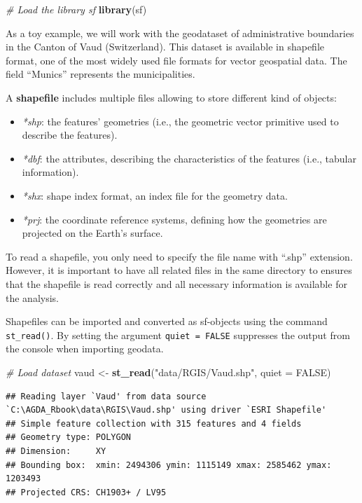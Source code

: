 \documentclass[
]{article}
\newenvironment{Shaded}{\begin{snugshade}}{\end{snugshade}}
\newcommand{\AttributeTok}[1]{\textcolor[rgb]{0.13,0.29,0.53}{#1}}
\newcommand{\CommentTok}[1]{\textcolor[rgb]{0.56,0.35,0.01}{\textit{#1}}}
\newcommand{\ConstantTok}[1]{\textcolor[rgb]{0.56,0.35,0.01}{#1}}
\newcommand{\FunctionTok}[1]{\textcolor[rgb]{0.13,0.29,0.53}{\textbf{#1}}}
\newcommand{\NormalTok}[1]{#1}
\newcommand{\OtherTok}[1]{\textcolor[rgb]{0.56,0.35,0.01}{#1}}
\newcommand{\StringTok}[1]{\textcolor[rgb]{0.31,0.60,0.02}{#1}}
\providecommand{\tightlist}{%
  \setlength{\itemsep}{0pt}\setlength{\parskip}{0pt}}
\begin{document}
\begin{Shaded}
\begin{Highlighting}[]
\CommentTok{\# Load the library sf }
\FunctionTok{library}\NormalTok{(sf)}
\end{Highlighting}
\end{Shaded}

As a toy example, we will work with the geodataset of administrative boundaries in the Canton of Vaud (Switzerland). This dataset is available in shapefile format, one of the most widely used file formats for vector geospatial data. The field ``Munics'' represents the municipalities.

A \textbf{shapefile} includes multiple files allowing to store different kind of objects:

\begin{itemize}
\tightlist
\item
  \emph{*shp}: the features' geometries (i.e., the geometric vector primitive used to describe the features).
\item
  \emph{*dbf}: the attributes, describing the characteristics of the features (i.e., tabular information).
\item
  \emph{*shx}: shape index format, an index file for the geometry data.
\item
  \emph{*prj}: the coordinate reference systems, defining how the geometries are projected on the Earth's surface.
\end{itemize}

To read a shapefile, you only need to specify the file name with ``.shp'' extension. However, it is important to have all related files in the same directory to ensures that the shapefile is read correctly and all necessary information is available for the analysis.

Shapefiles can be imported and converted as sf-objects using the command \texttt{st\_read()}. By setting the argument \texttt{quiet\ =\ FALSE} suppresses the output from the console when importing geodata.

\begin{Shaded}
\begin{Highlighting}[]
\CommentTok{\# Load dataset}
\NormalTok{vaud }\OtherTok{\textless{}{-}} \FunctionTok{st\_read}\NormalTok{(}\StringTok{"data/RGIS/Vaud.shp"}\NormalTok{, }\AttributeTok{quiet =} \ConstantTok{FALSE}\NormalTok{)}
\end{Highlighting}
\end{Shaded}

\begin{verbatim}
## Reading layer `Vaud' from data source `C:\AGDA_Rbook\data\RGIS\Vaud.shp' using driver `ESRI Shapefile'
## Simple feature collection with 315 features and 4 fields
## Geometry type: POLYGON
## Dimension:     XY
## Bounding box:  xmin: 2494306 ymin: 1115149 xmax: 2585462 ymax: 1203493
## Projected CRS: CH1903+ / LV95
\end{verbatim}
\end{document}
